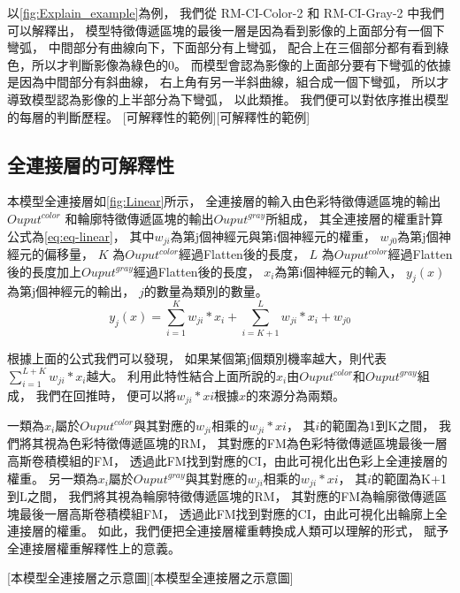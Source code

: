 \documentclass[class=NCU_thesis, crop=false]{standalone}
\begin{document}
	以\cref{fig:Explain_example}為例，
	我們從 RM-CI-Color-2 和 RM-CI-Gray-2 中我們可以解釋出，
	模型特徵傳遞區塊的最後一層是因為看到影像的上面部分有一個下彎弧，
	中間部分有曲線向下，下面部分有上彎弧，
	配合上在三個部分都有看到綠色，所以才判斷影像為綠色的0。
	而模型會認為影像的上面部分要有下彎弧的依據是因為中間部分有斜曲線，
	右上角有另一半斜曲線，組合成一個下彎弧，
	所以才導致模型認為影像的上半部分為下彎弧，
	以此類推。
	我們便可以對依序推出模型的每層的判斷歷程。
	[可解釋性的範例][可解釋性的範例]

\pagebreak

\subsection{全連接層的可解釋性}
本模型全連接層如\cref{fig:Linear}所示，
全連接層的輸入由色彩特徵傳遞區塊的輸出$Ouput^{color}$
和輪廓特徵傳遞區塊的輸出$Ouput^{gray}$所組成，
其全連接層的權重計算公式為\cref{eq:eq-linear}，
其中$w_{ji}$為第j個神經元與第i個神經元的權重，
$w_{j0}$為第j個神經元的偏移量，
$K$ 為$Ouput^{color}$經過Flatten後的長度，
$L$ 為$Ouput^{color}$經過Flatten後的長度加上$Ouput^{gray}$經過Flatten後的長度，
$x_{i}$為第i個神經元的輸入，
$y_{j}(x)$為第j個神經元的輸出，
$j$的數量為類別的數量。
\begin{equation}
    \label{eq:eq-linear}
    y_{j}(x) = \sum_{i=1}^{K}w_{ji} * x_{i} + \sum_{i=K+1}^{L}w_{ji} * x_{i} + w_{j0}
\end{equation}

根據上面的公式我們可以發現，
如果某個第j個類別機率越大，則代表$\sum_{i=1}^{L+K}w_{ji} * x_{i}$越大。
利用此特性結合上面所說的$x_{i}$由$Ouput^{color}$和$Ouput^{gray}$組成，
我們在回推時，
便可以將$w_{ji} * x{i}$根據$x$的來源分為兩類。

一類為$x_{i}$屬於$Ouput^{color}$與其對應的$w_{ji}$相乘的$w_{ji} * x{i}$，
其$i$的範圍為1到K之間，
我們將其視為色彩特徵傳遞區塊的RM，
其對應的FM為色彩特徵傳遞區塊最後一層高斯卷積模組的FM，
透過此FM找到對應的CI，由此可視化出色彩上全連接層的權重。
另一類為$x_{i}$屬於$Ouput^{gray}$與其對應的$w_{ji}$相乘的$w_{ji} * x{i}$，
其$i$的範圍為K+1到L之間，
我們將其視為輪廓特徵傳遞區塊的RM，
其對應的FM為輪廓徵傳遞區塊最後一層高斯卷積模組FM，
透過此FM找到對應的CI，由此可視化出輪廓上全連接層的權重。
如此，我們便把全連接層權重轉換成人類可以理解的形式，
賦予全連接層權重解釋性上的意義。

[本模型全連接層之示意圖][本模型全連接層之示意圖]
\end{document}
